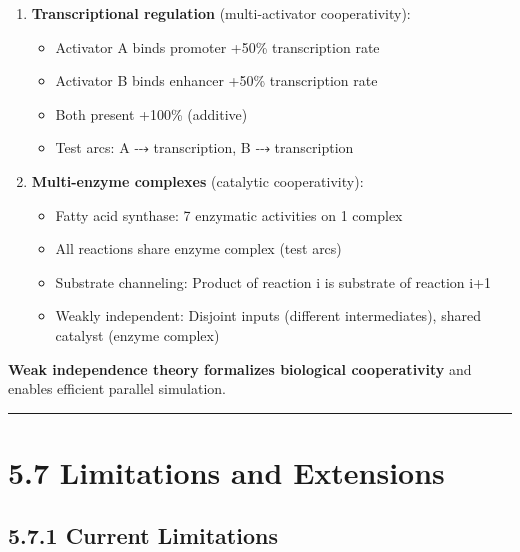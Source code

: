 \begin{enumerate}
\def\labelenumi{\arabic{enumi}.}
\setcounter{enumi}{1}
\tightlist
\item
  \textbf{Transcriptional regulation} (multi-activator cooperativity):

  \begin{itemize}
  \tightlist
  \item
    Activator A binds promoter \textrightarrow +50\% transcription rate
  \item
    Activator B binds enhancer \textrightarrow +50\% transcription rate
  \item
    Both present \textrightarrow +100\% (additive)
  \item
    Test arcs: A ⤏ transcription, B ⤏ transcription
  \end{itemize}
\item
  \textbf{Multi-enzyme complexes} (catalytic cooperativity):

  \begin{itemize}
  \tightlist
  \item
    Fatty acid synthase: 7 enzymatic activities on 1 complex
  \item
    All reactions share enzyme complex (test arcs)
  \item
    Substrate channeling: Product of reaction i is substrate of reaction
    i+1
  \item
    Weakly independent: Disjoint inputs (different intermediates),
    shared catalyst (enzyme complex)
  \end{itemize}
\end{enumerate}

\textbf{Weak independence theory formalizes biological cooperativity}
and enables efficient parallel simulation.

\begin{center}\rule{0.5\linewidth}{0.5pt}\end{center}

\hypertarget{limitations-and-extensions}{%
\section{5.7 Limitations and
Extensions}\label{limitations-and-extensions}}

\hypertarget{current-limitations}{%
\subsection{5.7.1 Current Limitations}\label{current-limitations}}


